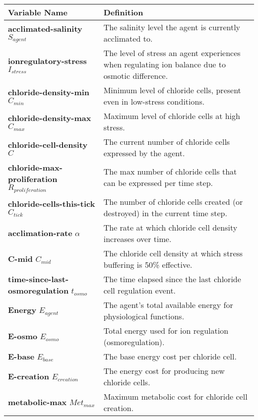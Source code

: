 \documentclass[
]{book}
\begin{document}
\begin{longtable}[]{@{}
  >{\raggedright\arraybackslash}p{}
  >{\raggedright\arraybackslash}p{}@{}}
\toprule\noalign{}
\begin{minipage}[b]{\linewidth}\raggedright
Variable Name
\end{minipage} & \begin{minipage}[b]{\linewidth}\raggedright
Definition
\end{minipage} \\
\midrule\noalign{}
\endhead
\bottomrule\noalign{}
\endlastfoot
\textbf{acclimated-salinity} \(S_{agent}\) & The salinity level the agent is currently acclimated to. \\
\textbf{ionregulatory-stress} \(I_{stress}\) & The level of stress an agent experiences when regulating ion balance due to osmotic difference. \\
\textbf{chloride-density-min} \(C_{min}\) & Minimum level of chloride cells, present even in low-stress conditions. \\
\textbf{chloride-density-max} \(C_{max}\) & Maximum level of chloride cells at high stress. \\
\textbf{chloride-cell-density} \(C\) & The current number of chloride cells expressed by the agent. \\
\textbf{chloride-max-proliferation} \(R_{proliferation}\) & The max number of chloride cells that can be expressed per time step. \\
\textbf{chloride-cells-this-tick} \(C_{tick}\) & The number of chloride cells created (or destroyed) in the current time step. \\
\textbf{acclimation-rate} \(\alpha\) & The rate at which chloride cell density increases over time. \\
\textbf{C-mid} \(C_{mid}\) & The chloride cell density at which stress buffering is 50\% effective. \\
\textbf{time-since-last-osmoregulation} \(t_{osmo}\) & The time elapsed since the last chloride cell regulation event. \\
\textbf{Energy} \(E_{agent}\) & The agent's total available energy for physiological functions. \\
\textbf{E-osmo} \(E_{osmo}\) & Total energy used for ion regulation (osmoregulation). \\
\textbf{E-base} \(E_{base}\) & The base energy cost per chloride cell. \\
\textbf{E-creation} \(E_{creation}\) & The energy cost for producing new chloride cells. \\
\textbf{metabolic-max} \(Met_{max}\) & Maximum metabolic cost for chloride cell creation. \\
\end{longtable}
\end{document}
